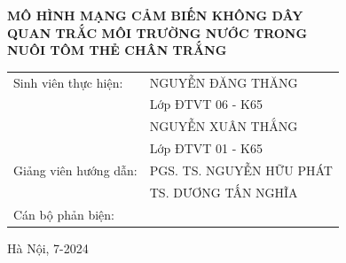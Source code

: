 \begin{center}
    \textbf{\fontsize{20pt}{0pt}\selectfont MÔ HÌNH MẠNG CẢM BIẾN KHÔNG DÂY}\\
    \textbf{\fontsize{20pt}{0pt}\selectfont QUAN TRẮC MÔI TRƯỜNG NƯỚC TRONG  } \\
    \textbf{\fontsize{20pt}{0pt}\selectfont NUÔI TÔM THẺ CHÂN TRẮNG}
\vspace{0.5cm}
\begin{table}[H]
    \centering
    \begin{tabular}{l l}
 \fontsize{14pt}{0pt}\selectfont Sinh viên thực hiện:    & \fontsize{14pt}{0pt}\selectfont NGUYỄN ĐĂNG THĂNG \vspace{6pt} \\ 
     & \fontsize{14pt}{0pt}\selectfont Lớp ĐTVT 06 - K65 \vspace{6pt}\\
     & \fontsize{14pt}{0pt}\selectfont NGUYỄN XUÂN THẮNG \vspace{6pt} \\ 
     &\fontsize{14pt}{0pt}\selectfont Lớp ĐTVT 01 - K65 \vspace{6pt}\\     
\fontsize{14pt}{0pt}\selectfont Giảng viên hướng dẫn: & \fontsize{14pt}{0pt}\selectfont PGS. TS. NGUYỄN HỮU PHÁT \vspace{6pt}\\
& \fontsize{14pt}{0pt}\selectfont TS. DƯƠNG TẤN NGHĨA \vspace{6pt}\\
\fontsize{14pt}{0pt}\selectfont Cán bộ phản biện: & 
\end{tabular}
\end{table}
\vspace{0cm}
 \fontsize{14pt}{0pt}\selectfont Hà Nội, 7-2024
\end{center}
\cleardoublepage
